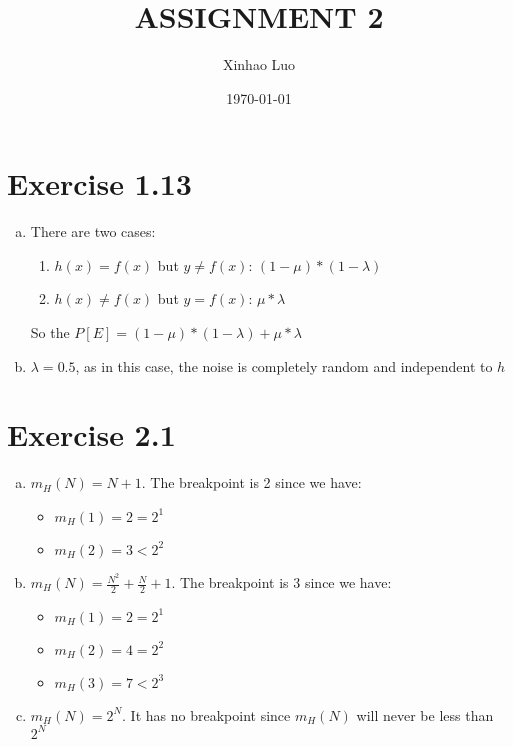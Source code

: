 \documentclass{article}
\title{\bf \Large ASSIGNMENT 2}
\author{Xinhao Luo}
\date{\today}
\def\math#1{$#1$}
\begin{document}
\maketitle
\medskip

\section{Exercise 1.13}

\begin{enumerate}[a)]
    \item There are two cases:
        \begin{enumerate}[1)]
            \item \math{h(x) = f(x)} but \math{y \neq f(x)}: \math{(1 - \mu) * (1 - \lambda)}
            \item \math{h(x) \neq f(x)} but \math{y = f(x)}: \math{\mu * \lambda}
        \end{enumerate}
    So the \math{P[E] = (1 - \mu) * (1 - \lambda) + \mu * \lambda}
    \item \math{\lambda = 0.5}, as in this case, the noise is completely random and independent to \math{h}
\end{enumerate}

\section{Exercise 2.1}

\begin{enumerate}[a)]
    \item \math{m_H(N) = N + 1}. The breakpoint is 2 since we have: 
        \begin{itemize}
            \item \math{m_H(1) = 2 = 2^1}
            \item \math{m_H(2) = 3 < 2^2} 
        \end{itemize}
    \item \math{m_H(N) = \frac{N^2}{2} + \frac{N}{2} + 1}. The breakpoint is 3 since we have:
        \begin{itemize}
            \item \math{m_H(1) = 2 = 2^1}
            \item \math{m_H(2) = 4 = 2^2}
            \item \math{m_H(3) = 7 < 2^3}
        \end{itemize}
    \item \math{m_H(N) = 2^N}. It has no breakpoint since \math{m_H(N)} will never be less than \math{2^N}
\end{enumerate}
\end{document}

